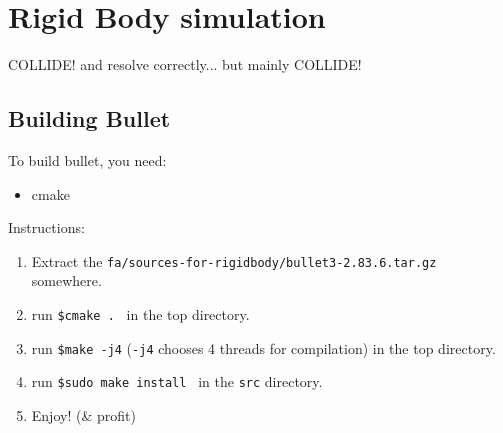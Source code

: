 \section{Rigid Body simulation}

COLLIDE! and resolve correctly... but mainly COLLIDE!

\subsection{Building Bullet}
To build bullet, you need:
\begin{itemize}
\item cmake
\end{itemize}
Instructions:
\begin{enumerate}
\item Extract the \verb+fa/sources-for-rigidbody/bullet3-2.83.6.tar.gz + somewhere.
\item run \verb+$cmake . + in the top directory.
\item run \verb+$make -j4+ (\verb+-j4+ chooses 4 threads for compilation) in the top directory.
\item run \verb+$sudo make install + in the \verb+src+ directory.
\item Enjoy! (\& profit)
\end{enumerate}